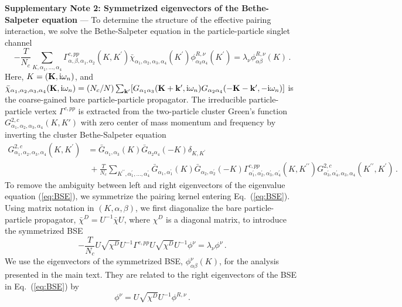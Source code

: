 \documentclass[11pt,superscriptaddress,floatfix,notitlepage]{revtex4-1}
\begin{document}
\newpage\noindent\textbf{Supplementary Note 2: Symmetrized eigenvectors of the Bethe-Salpeter equation} --- To determine the structure of the effective pairing interaction, we solve the Bethe-Salpeter equation in the particle-particle singlet channel
\begin{equation} \label{eq:BSE}
    -\frac{T}{N_c} \sum_{K,\alpha_1,\dots,\alpha_4} \Gamma^{c, pp}_{\alpha,\beta,\alpha_1,\alpha_2}(K,K^\prime)\bar{\chi}^{\phantom\dagger}_{\alpha_1,\alpha_2,\alpha_3,\alpha_4}(K^\prime)  \phi^{R,\nu}_{\alpha_3\alpha_4}(K^\prime) = \lambda^{\phantom\dagger}_\nu \phi^{R,\nu}_{\alpha\beta}(K)\,.
\end{equation}
Here, $K=({\bf K},\text{i}\omega_n)$, and $\bar{\chi}_{\alpha_1,\alpha_2,\alpha_3,\alpha_4}({\bf K}, \text{i}\omega_n) = (N_c/N) \sum_{{\bf k}^\prime} [G_{\alpha_1\alpha_3}({\bf K+k'},\text{i}\omega_n)G_{\alpha_2\alpha_4}(-{\bf K}-{\bf k}^\prime, -\text{i}\omega_n)]$ is the coarse-gained bare particle-particle propagator. The irreducible particle-particle vertex $\Gamma^{c, pp}$ is extracted from the two-particle cluster Green's function $G^{2,c}_{\alpha_1,\alpha_2,\alpha_3,\alpha_4}(K,K')$ with zero center of mass momentum and frequency by inverting the cluster Bethe-Salpeter equation
\begin{equation}
\begin{split}
G^{2,c}_{\alpha_1,\alpha_2,\alpha_3,\alpha_4}(K,K^\prime)&=\bar{G}_{\alpha_1,\alpha_3}(K)\bar{G}_{\alpha_2\alpha_4}(-K)\delta_{K,K^\prime}
\\&\
+\frac{T}{N_c}\sum_{K^{\prime\prime},\alpha^\prime_1,\dots,\alpha^\prime_4}\bar{G}_{\alpha_1,\alpha^\prime_1}(K)\bar{G}_{\alpha_2,\alpha^\prime_2}(-K)\Gamma^{c,pp}_{\alpha^\prime_1,\alpha^\prime_2,\alpha^\prime_3,\alpha^\prime_4}(K,K^{\prime\prime})G^{2,c}_{\alpha^\prime_3,\alpha^\prime_4,\alpha_3,\alpha_4}(K^{\prime\prime},K^\prime)\,.
\label{BSE1}
\end{split}
\end{equation}
To remove the ambiguity between left and right eigenvectors of the eigenvalue equation (\ref{eq:BSE}), we symmetrize the pairing kernel entering Eq.~(\ref{eq:BSE}). Using matrix notation in $(K, \alpha, \beta)$, we first diagonalize the bare particle-particle propagator, $\bar{\chi}^D = U^{-1}\bar{\chi}U$, where $\chi^D$ is a diagonal matrix, to introduce the symmetrized BSE
\begin{equation}\label{sBSE}
-\frac{T}{N_c} U \sqrt{\chi^D}U^{-1} \Gamma^{c,pp} U \sqrt{\chi^D}U^{-1} \phi^\nu = \lambda_\nu \phi^\nu\,.
\end{equation}
We use the eigenvectors of the symmetrized BSE, $\phi^\nu_{\alpha\beta}(K)$, for the analysis presented in the main text. They are related to the right eigenvectors of the BSE in Eq.~(\ref{eq:BSE}) by 
\begin{equation}
    \phi^\nu = U\sqrt{\chi^D}U^{-1}\phi^{R,\nu}\,.
\end{equation}
\end{document}
